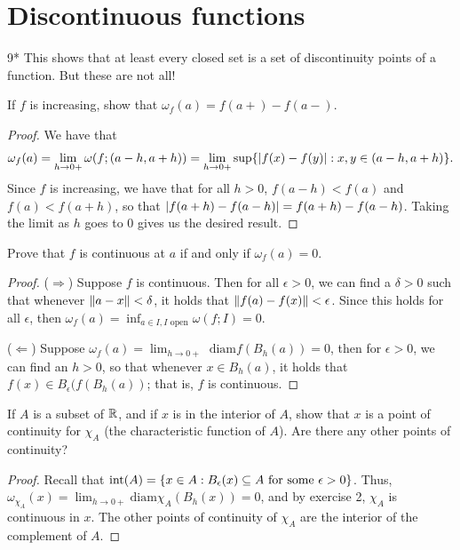 \section{Discontinuous functions}

9* This shows that at least every closed set is a set of discontinuity points of a function. But these are not all!

\begin{exercise}{1}
If $f$ is increasing, show that $\omega_f(a)=f(a+)-f(a-)$.
\end{exercise}
\begin{proof}
We have that 
\begin{align*}
    \omega_f(a) = \lim_{h\to0+}\omega(f;(a-h,a+h)) = \lim_{h \to 0+} \sup\{\left\lvert f(x)-f(y)\right\rvert: x,y\in (a-h,a+h)\}.
\end{align*}
Since $f$ is increasing, we have that for all $h>0$, $f(a-h)<f(a)$ and $f(a)<f(a+h)$, so that $\left\lvert f(a+h)-f(a-h)\right\rvert = f(a+h)-f(a-h)$.
Taking the limit as $h$ goes to 0 gives us the desired result.
\end{proof} 

\begin{exercise}{2}
Prove that $f$ is continuous at $a$ if and only if $\omega_f(a)=0$.
\end{exercise}
\begin{proof}
($\Rightarrow$)
Suppose $f$ is continuous.
Then for all $\epsilon>0$, we can find a $\delta>0$ such that whenever $\left\lVert a-x\right\rVert<\delta$, it holds that $\left\lVert f(a)-f(x)\right\rVert<\epsilon$. 
Since this holds for all $\epsilon$, then $\omega_f(a) = \inf_{a\in I, I\text{ open}}\omega(f; I) = 0$.

($\Leftarrow$)
Suppose $\omega_f(a)= \lim_{h\to 0+}\text{ diam}f(B_h(a)) = 0$, then for $\epsilon>0$, we can find an $h>0$, so that whenever $x\in B_h(a)$, it holds that $f(x) \in B_\epsilon(f(B_h(a))$;
that is, $f$ is continuous.
\end{proof} 

\begin{exercise}{5}
If $A$ is a subset of $\mathbb{R}$, and if $x$ is in the interior of $A$, show that $x$ is a point of continuity for $\chi_A$ (the characteristic function of $A$).
Are there any other points of continuity?
\end{exercise}
\begin{proof}
Recall that $\text{int}(A)=\{x\in A:B_\epsilon(x)\subseteq A\text{ for some }\epsilon>0\}$.
Thus, $\omega_{\chi_A}(x) = \lim_{h\to 0+}\text{diam}\chi_A(B_h(x)) = 0$, and by exercise 2, $\chi_A$ is continuous in $x$.
The other points of continuity of $\chi_A$ are the interior of the complement of $A$.
\end{proof} 

